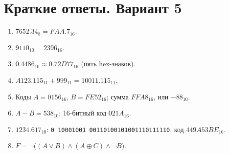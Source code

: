 \section*{Краткие ответы. Вариант 5}
\begin{enumerate}
    \item $7652.34_8=FAA.7_{16}$.
    \item $9110_{10}=2396_{16}$.
    \item $0.4486_{10}\approx0.72D77_{16}$ (пять hex-знаков).
    \item $A123.115_{11}+999_{11}=10011.115_{11}$.
    \item Коды $A=0156_{16}$, $B=FE52_{16}$; сумма $FFA8_{16}$, или $-88_{10}$.
    \item $A-B=538_{10}$; 16-битный код $021A_{16}$.
    \item $1234.617_{10}$: \texttt{0 10001001 00110100101001110111110}, код $449A53BE_{16}$.
    \item $F=\lnot\bigl((A\lor B)\land(A\oplus C)\land\lnot B\bigr)$.
\end{enumerate}
